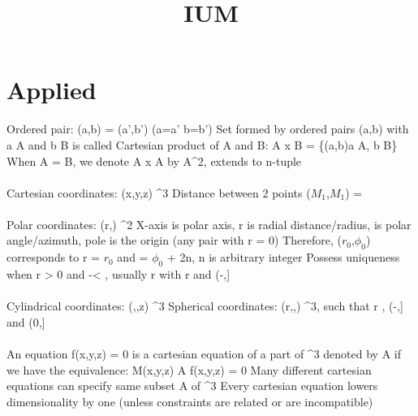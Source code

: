 \documentclass{article}
\begin{document}
\title{IUM}

\maketitle

\tableofcontents

\section{Applied}

Ordered pair: \math (a,b) = (a',b') \longleftrightarrow (a=a' \wedge b=b')\)
\newline Set formed by ordered pairs \math (a,b)\) with a \in A\) and b \in B\) is called Cartesian product of A and B: A x B = \math \{(a,b)\vert a \in A, b \in B\}\)
\newline When A = B, we denote A x A by A^2\), extends to n-tuple
\\
\\
Cartesian coordinates: \math(x,y,z) \in \Re^3\)
\newline Distance between 2 points \math \triangle ($M_1$,$M_1$) = \)
\\
\\
Polar coordinates: \math(r,\phi) \in \Re^2\)
\newline X-axis is polar axis, r is radial distance/radius, \phi\) is polar angle/azimuth, pole is the origin (any pair with r = 0)
\newline Therefore, ($r_0$,$\phi_0$) corresponds to r = $r_0$ and \phi = $\phi_0$ + 2n\pi\), n is arbitrary integer
\newline Possess uniqueness when \math r > 0\) and -\pi < \phi \leq \pi\), usually r \geq{} with r \in \Re\) and \phi \in (-\pi,\pi]\)
\\
\\
Cylindrical coordinates: \math(\rho,\phi,z) \in \Re^3\)
\newline Spherical coordinates: \math(r,\phi,\theta) \in \Re^3\), such that r , \phi \in (-\pi,\pi]\) and \theta \in (0,\pi]\)
\\
\\
An equation \math f(x,y,z) = 0\) is a cartesian equation of a part of \Re^3\) denoted by A if we have the equivalence: \math M(x,y,z) \in A \longleftrightarrow f(x,y,z) = 0 \)
\newline Many different cartesian equations can specify same subset A of \Re^3\)
\newline Every cartesian equation lowers dimensionality by one (unless constraints are related or are incompatible)
\end{document}
